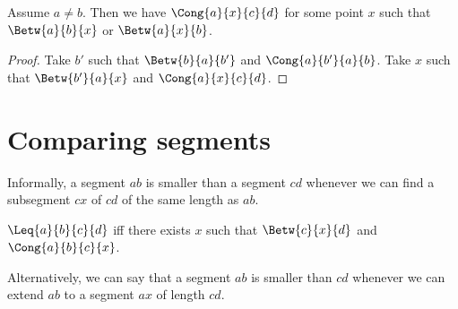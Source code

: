\documentclass[10pt,a4paper,parskip=half,numbers=endperiod,parskip]{scrartcl}
\begin{document}
  \begin{forthel}
    \begin{lemma}%
      Assume $a\neq b$.
      Then
        we have $\Cong{a}{x}{c}{d}$ for some point $x$ such that
          $\Betw{a}{b}{x}$ or $\Betw{a}{x}{b}$.
    \end{lemma}
    \begin{proof}
      Take $b'$ such that $\Betw{b}{a}{b'}$ and $\Cong{a}{b'}{a}{b}$.
      Take $x$ such that $\Betw{b'}{a}{x}$ and $\Cong{a}{x}{c}{d}$.
    \end{proof}
  \end{forthel}

  \section{Comparing segments}

  Informally, a segment $ab$ is smaller than a segment $cd$ whenever
  we can find a subsegment $cx$
  of $cd$ of the same length as $ab$.


  \begin{forthel}
    \begin{definition} %
      $\Leq{a}{b}{c}{d}$ iff there exists $x$ such that $\Betw{c}{x}{d}$ and $\Cong{a}{b}{c}{x}$.
    \end{definition}

  \end{forthel}

  Alternatively, we can say that a segment $ab$ is smaller than $cd$ whenever we can extend $ab$
  to a segment $ax$ of length $cd$.

\end{document}
